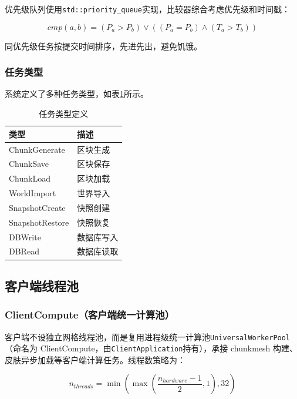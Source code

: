 优先级队列使用\texttt{std::priority\_queue}实现，比较器综合考虑优先级和时间戳：

\begin{equation}
cmp(a, b) = (P_a > P_b) \lor ((P_a = P_b) \land (T_a > T_b))
\end{equation}

同优先级任务按提交时间排序，先进先出，避免饥饿。

\subsubsection{任务类型}

系统定义了多种任务类型，如表\ref{tab:task_types}所示。

\begin{table}[h]
\centering
\caption{任务类型定义}
\label{tab:task_types}
\begin{tabular}{ll}
\toprule
\textbf{类型} & \textbf{描述} \\
\midrule
ChunkGenerate & 区块生成 \\
ChunkSave & 区块保存 \\
ChunkLoad & 区块加载 \\
WorldImport & 世界导入 \\
SnapshotCreate & 快照创建 \\
SnapshotRestore & 快照恢复 \\
DBWrite & 数据库写入 \\
DBRead & 数据库读取 \\
\bottomrule
\end{tabular}
\end{table}

\subsection{客户端线程池}

\subsubsection{ClientCompute（客户端统一计算池）}

客户端不设独立网格线程池，而是复用进程级统一计算池\texttt{UniversalWorkerPool}（命名为 ClientCompute，由\texttt{ClientApplication}持有），承接 chunkmesh 构建、皮肤异步加载等客户端计算任务。线程数策略为：

\begin{equation}
n_{threads} = \min\left(\max\left(\frac{n_{hardware} - 1}{2}, 1\right), 32\right)
\end{equation}


